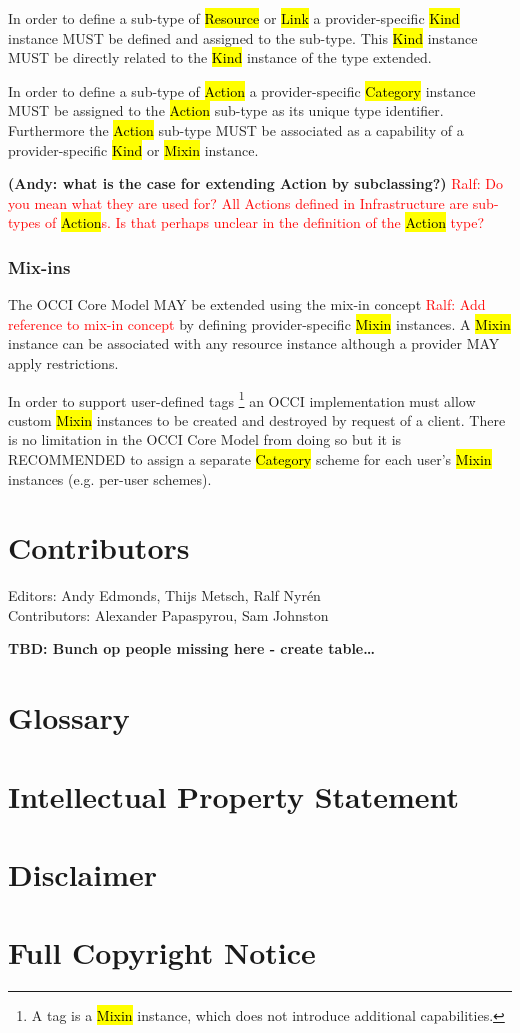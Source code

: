 \documentclass[10pt,a4paper]{article}
\newcommand{\ralf}[1]{\textcolor{red}{Ralf: #1}}
\begin{document}
In order to define a sub-type of \hl{Resource} or \hl{Link} a provider-specific
\hl{Kind} instance MUST be defined and assigned to the sub-type. This
\hl{Kind} instance MUST be directly related to the \hl{Kind} instance of the
type extended.

In order to define a sub-type of \hl{Action} a provider-specific \hl{Category}
instance MUST be assigned to the \hl{Action} sub-type as its unique type identifier.
Furthermore the \hl{Action} sub-type MUST be associated as a capability of a
provider-specific \hl{Kind} or \hl{Mixin} instance.

\textbf{(Andy: what is the case for extending Action by subclassing?)}
\ralf{Do you mean what they are used for? All Actions defined in Infrastructure
are sub-types of \hl{Action}s. Is that perhaps unclear in the definition of the
\hl{Action} type?}

\subsubsection{Mix-ins}
The OCCI Core Model MAY be extended using the mix-in concept
\ralf{Add reference to mix-in concept}
by defining
provider-specific \hl{Mixin} instances.  A \hl{Mixin} instance can be associated
with any resource instance although a provider MAY apply restrictions.

In order to support user-defined tags \footnote{A tag is a \hl{Mixin} instance, 
which does not introduce additional capabilities.} an OCCI implementation must allow custom
\hl{Mixin} instances to be created and destroyed by request of a client.
There is no limitation in the OCCI Core Model from doing so but it is RECOMMENDED to
assign a separate \hl{Category} scheme for each user's \hl{Mixin} instances (e.g. per-user schemes).

\section{Contributors}
Editors: Andy Edmonds, Thijs Metsch, Ralf Nyrén \\
Contributors: Alexander Papaspyrou, Sam Johnston

\textbf{TBD: Bunch op people missing here - create table\ldots}

\section{Glossary}
\label{sec:glossary}



\section{Intellectual Property Statement}


\section{Disclaimer}


\section{Full Copyright Notice}




\end{document}
